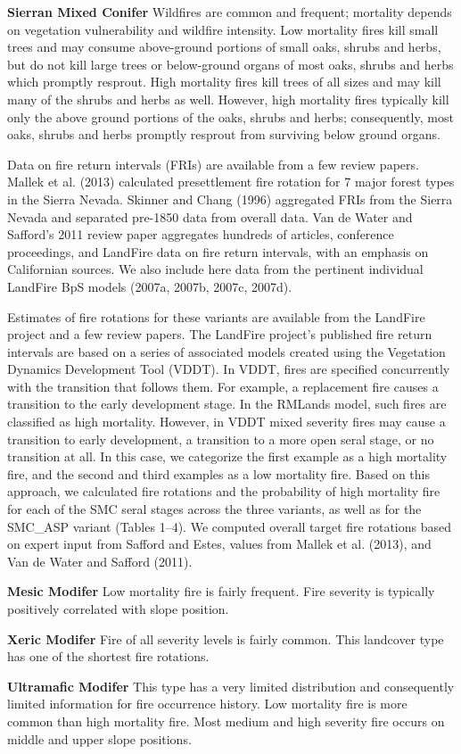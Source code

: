 \textbf{Sierran Mixed Conifer } Wildfires are common and frequent; mortality depends on vegetation vulnerability and wildfire intensity. Low mortality fires kill small trees and may consume above-ground portions of small oaks, shrubs and herbs, but do not kill large trees or below-ground organs of most oaks, shrubs and herbs which promptly resprout. High mortality fires kill trees of all sizes and may kill many of the shrubs and herbs as well. However, high mortality fires typically kill only the above ground portions of the oaks, shrubs and herbs; consequently, most oaks, shrubs and herbs promptly resprout from surviving below ground organs.

Data on fire return intervals (FRIs) are available from a few review papers. Mallek et al. (2013) calculated presettlement fire rotation for 7 major forest types in the Sierra Nevada. Skinner and Chang (1996) aggregated FRIs from the Sierra Nevada and separated pre-1850 data from overall data. Van de Water and Safford’s 2011 review paper aggregates hundreds of articles, conference proceedings, and LandFire data on fire return intervals, with an emphasis on Californian sources. We also include here data from the pertinent individual LandFire BpS models (2007a, 2007b, 2007c, 2007d).

Estimates of fire rotations for these variants are available from the LandFire project and a few review papers. The LandFire project’s published fire return intervals are based on a series of associated models created using the Vegetation Dynamics Development Tool (VDDT). In VDDT, fires are specified concurrently with the transition that follows them. For example, a replacement fire causes a transition to the early development stage. In the RMLands model, such fires are classified as high mortality. However, in VDDT mixed severity fires may cause a transition to early development, a transition to a more open seral stage, or no transition at all. In this case, we categorize the first example as a high mortality fire, and the second and third examples as a low mortality fire. Based on this approach, we calculated fire rotations and the probability of high mortality fire for each of the SMC seral stages across the three variants, as well as for the SMC\_ASP variant (Tables 1–4). We computed overall target fire rotations based on expert input from Safford and Estes, values from Mallek et al. (2013), and Van de Water and Safford (2011). 


\begin{adjustwidth}{2cm}{}
\textbf{Mesic Modifer } Low mortality fire is fairly frequent. Fire severity is typically positively correlated with slope position. 

\textbf{Xeric Modifer} Fire of all severity levels is fairly common. This landcover type has one of the shortest fire rotations. 

\textbf{Ultramafic Modifer} This type has a very limited distribution and consequently limited information for fire occurrence history. Low mortality fire is more common than high mortality fire. Most medium and high severity fire occurs on middle and upper slope positions.

\end{adjustwidth}

